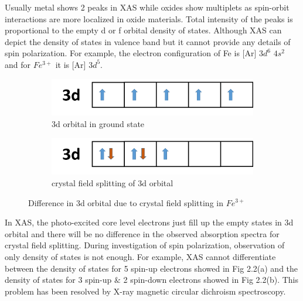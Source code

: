 \documentclass[main.tex]{subfiles}
\begin{document}
Usually metal shows 2 peaks in XAS while oxides show multiplets as spin-orbit interactions are more localized in oxide materials. Total intensity of the peaks is proportional to the empty d or f orbital density of states. Although XAS can depict the density of states in valence band but it cannot provide any details of spin polarization. For example, the electron configuration of Fe is [Ar] $3d^{6}$ $4s^{2}$ and for $Fe^{3+}$ it is [Ar] $3d^{5}$. 

\begin{figure}[!htb]
\centering
	\begin{subfigure}[h]{0.5\textwidth}
		\centering
		\includegraphics[width=\linewidth]{fe_3d_1}
  		\caption{3d orbital in ground state}
	\end{subfigure}
	\begin{subfigure}[h]{0.5\textwidth}
  		\centering
  		\includegraphics[width=\linewidth]{fe_3d_2}
  		\caption{crystal field splitting of 3d orbital}
	\end{subfigure}
\caption{Difference in 3d orbital due to crystal field splitting in $Fe^{3+}$}
\label{fig:fig}

\end{figure}
\FloatBarrier

In XAS, the photo-excited core level electrons just fill up the empty states in 3d orbital and there will be no difference in the observed absorption spectra for crystal field splitting. During investigation of spin polarization, observation of only density of states is not enough. For example, XAS cannot differentiate between the density of states for 5 spin-up electrons showed in Fig 2.2(a) and the density of states for 3 spin-up $\&$ 2 spin-down electrons showed in Fig 2.2(b). This problem has been resolved by X-ray magnetic circular dichroism spectroscopy. 

\section{}
\end{document}
